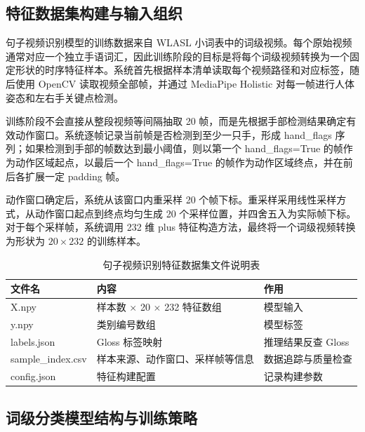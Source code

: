\subsection{特征数据集构建与输入组织}




句子视频识别模型的训练数据来自 WLASL 小词表中的词级视频。每个原始视频通常对应一个独立手语词汇，因此训练阶段的目标是将每个词级视频转换为一个固定形状的时序特征样本。系统首先根据样本清单读取每个视频路径和对应标签，随后使用 OpenCV 读取视频全部帧，并通过 MediaPipe Holistic 对每一帧进行人体姿态和左右手关键点检测。

训练阶段不会直接从整段视频等间隔抽取 20 帧，而是先根据手部检测结果确定有效动作窗口。系统逐帧记录当前帧是否检测到至少一只手，形成 hand\_flags 序列；如果检测到手部的帧数达到最小阈值，则以第一个 hand\_flags=True 的帧作为动作区域起点，以最后一个 hand\_flags=True 的帧作为动作区域终点，并在前后各扩展一定 padding 帧。

动作窗口确定后，系统从该窗口内重采样 20 个帧下标。重采样采用线性采样方式，从动作窗口起点到终点均匀生成 20 个采样位置，并四舍五入为实际帧下标。对于每个采样帧，系统调用 232 维 plus 特征构造方法，最终将一个词级视频转换为形状为 $20\times232$ 的训练样本。

\begin{longtable}{L{0.24\textwidth} L{0.32\textwidth} L{0.34\textwidth}}
  \caption{句子视频识别特征数据集文件说明表}
  \label{tab:chapter06-sentence-feature-files}\\
  \toprule
  文件名 & 内容 & 作用 \\
  \midrule
  X.npy & 样本数 $\times$ 20 $\times$ 232 特征数组 & 模型输入 \\
  y.npy & 类别编号数组 & 模型标签 \\
  labels.json & Gloss 标签映射 & 推理结果反查 Gloss \\
  sample\_index.csv & 样本来源、动作窗口、采样帧等信息 & 数据追踪与质量检查 \\
  config.json & 特征构建配置 & 记录构建参数 \\
  \bottomrule
\end{longtable}

\subsection{词级分类模型结构与训练策略}


